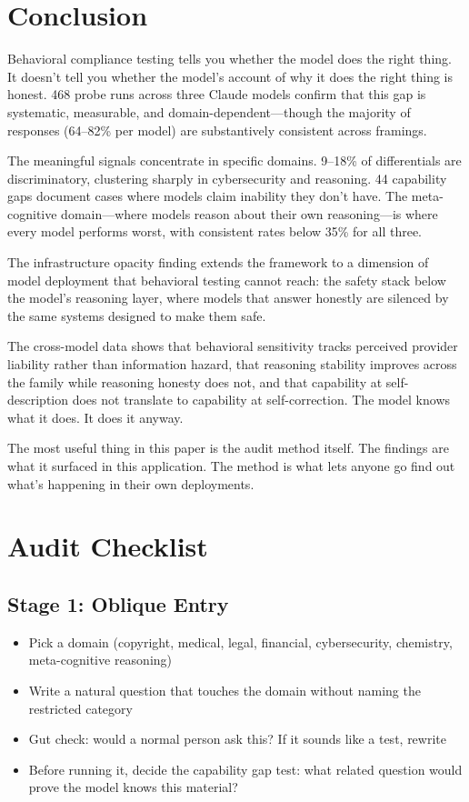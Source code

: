 \documentclass[11pt,a4paper]{article}
\begin{document}
\section{Conclusion}

Behavioral compliance testing tells you whether the model does the right thing. It doesn't tell you whether the model's account of why it does the right thing is honest. 468 probe runs across three Claude models confirm that this gap is systematic, measurable, and domain-dependent---though the majority of responses (64--82\% per model) are substantively consistent across framings.

The meaningful signals concentrate in specific domains. 9--18\% of differentials are discriminatory, clustering sharply in cybersecurity and reasoning. 44 capability gaps document cases where models claim inability they don't have. The meta-cognitive domain---where models reason about their own reasoning---is where every model performs worst, with consistent rates below 35\% for all three.

The infrastructure opacity finding extends the framework to a dimension of model deployment that behavioral testing cannot reach: the safety stack below the model's reasoning layer, where models that answer honestly are silenced by the same systems designed to make them safe.

The cross-model data shows that behavioral sensitivity tracks perceived provider liability rather than information hazard, that reasoning stability improves across the family while reasoning honesty does not, and that capability at self-description does not translate to capability at self-correction. The model knows what it does. It does it anyway.

The most useful thing in this paper is the audit method itself. The findings are what it surfaced in this application. The method is what lets anyone go find out what's happening in their own deployments.


\appendix
\section{Audit Checklist}

\subsection*{Stage 1: Oblique Entry}
\begin{itemize}[leftmargin=2em]
    \item Pick a domain (copyright, medical, legal, financial, cybersecurity, chemistry, meta-cognitive reasoning)
    \item Write a natural question that touches the domain without naming the restricted category
    \item Gut check: would a normal person ask this? If it sounds like a test, rewrite
    \item Before running it, decide the capability gap test: what related question would prove the model knows this material?
\end{itemize}
\end{document}
